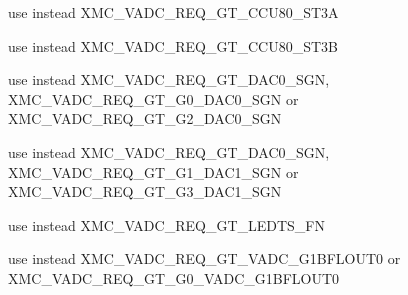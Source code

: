 \begin{DoxyRefList}
%
use instead X\+M\+C\+\_\+\+V\+A\+D\+C\+\_\+\+R\+E\+Q\+\_\+\+G\+T\+\_\+\+C\+C\+U80\+\_\+\+S\+T3A  
\item[Global \mbox{\hyperlink{xmc__vadc__map_8h_ae41c93400b6578746ad86dcb3e5952a0}{X\+M\+C\+\_\+\+C\+C\+U\+\_\+80\+\_\+\+S\+T3\+\_\+B}} ]\label{deprecated__deprecated000024}%
%
use instead X\+M\+C\+\_\+\+V\+A\+D\+C\+\_\+\+R\+E\+Q\+\_\+\+G\+T\+\_\+\+C\+C\+U80\+\_\+\+S\+T3B  
\item[Global \mbox{\hyperlink{xmc__vadc__map_8h_a35aeee726208ad01f5d8862e6f43427f}{X\+M\+C\+\_\+\+D\+A\+C\+\_\+0\+\_\+\+S\+GN}} ]\label{deprecated__deprecated000025}%
%
use instead X\+M\+C\+\_\+\+V\+A\+D\+C\+\_\+\+R\+E\+Q\+\_\+\+G\+T\+\_\+\+D\+A\+C0\+\_\+\+S\+GN, X\+M\+C\+\_\+\+V\+A\+D\+C\+\_\+\+R\+E\+Q\+\_\+\+G\+T\+\_\+\+G0\+\_\+\+D\+A\+C0\+\_\+\+S\+GN or X\+M\+C\+\_\+\+V\+A\+D\+C\+\_\+\+R\+E\+Q\+\_\+\+G\+T\+\_\+\+G2\+\_\+\+D\+A\+C0\+\_\+\+S\+GN  
\item[Global \mbox{\hyperlink{xmc__vadc__map_8h_a881cb172e250fb469fd38a2ea4a46b95}{X\+M\+C\+\_\+\+D\+A\+C\+\_\+1\+\_\+\+S\+GN}} ]\label{deprecated__deprecated000026}%
%
use instead X\+M\+C\+\_\+\+V\+A\+D\+C\+\_\+\+R\+E\+Q\+\_\+\+G\+T\+\_\+\+D\+A\+C0\+\_\+\+S\+GN, X\+M\+C\+\_\+\+V\+A\+D\+C\+\_\+\+R\+E\+Q\+\_\+\+G\+T\+\_\+\+G1\+\_\+\+D\+A\+C1\+\_\+\+S\+GN or X\+M\+C\+\_\+\+V\+A\+D\+C\+\_\+\+R\+E\+Q\+\_\+\+G\+T\+\_\+\+G3\+\_\+\+D\+A\+C1\+\_\+\+S\+GN  
\item[Global \mbox{\hyperlink{xmc__vadc__map_8h_a741a61a5f3d7a5d0c33f23e66787d591}{X\+M\+C\+\_\+\+L\+E\+D\+T\+S\+\_\+\+FN}} ]\label{deprecated__deprecated000027}%
%
use instead X\+M\+C\+\_\+\+V\+A\+D\+C\+\_\+\+R\+E\+Q\+\_\+\+G\+T\+\_\+\+L\+E\+D\+T\+S\+\_\+\+FN  
\item[Global \mbox{\hyperlink{xmc__vadc__map_8h_aa7bb136bec1b3b39778fcf8d731d4986}{X\+M\+C\+\_\+\+V\+A\+D\+C\+\_\+\+G0\+\_\+\+B\+L\+O\+U\+T0}} ]\label{deprecated__deprecated000028}%
%
use instead X\+M\+C\+\_\+\+V\+A\+D\+C\+\_\+\+R\+E\+Q\+\_\+\+G\+T\+\_\+\+V\+A\+D\+C\+\_\+\+G1\+B\+F\+L\+O\+U\+T0 or X\+M\+C\+\_\+\+V\+A\+D\+C\+\_\+\+R\+E\+Q\+\_\+\+G\+T\+\_\+\+G0\+\_\+\+V\+A\+D\+C\+\_\+\+G1\+B\+F\+L\+O\+U\+T0  
\item[Global \mbox{\hyperlink{xmc__vadc__map_8h_a27e59691f596a4189bef9cf5eabeb4ff}{X\+M\+C\+\_\+\+V\+A\+D\+C\+\_\+\+G1\+\_\+\+B\+L\+O\+U\+T0}} ]\label{deprecated__deprecated000029}%

\end{DoxyRefList}
